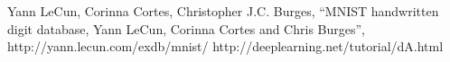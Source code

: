 \documentclass[10pt,a4paper,twocolumn]{jarticle}
\begin{document}
\begin{thebibliography}{9}
   Yann LeCun, Corinna Cortes, Christopher J.C. Burges,
    ``MNIST handwritten digit database, Yann LeCun, Corinna Cortes and Chris Burges'',
    http://yann.lecun.com/exdb/mnist/
   http://deeplearning.net/tutorial/dA.html
\end{thebibliography}

\end{document}
